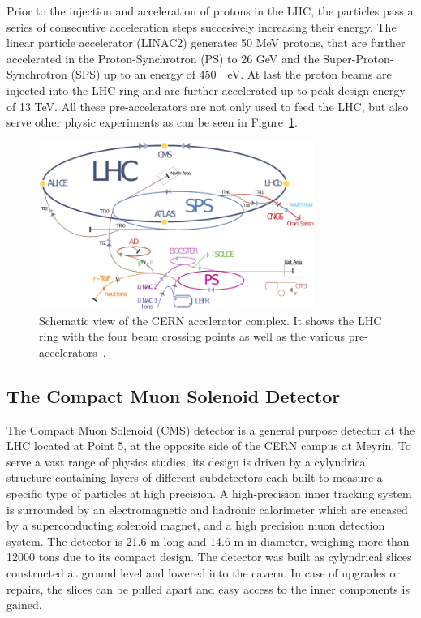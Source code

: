 Prior to the injection and acceleration of protons in the LHC, the particles
pass a series of consecutive acceleration steps succesively increasing their
energy. The linear particle accelerator (LINAC2) generates 50 MeV protons, that
are further accelerated in the Proton-Synchrotron (PS) to 26 GeV and
the Super-Proton-Synchrotron (SPS) up to an energy of \SI{450}{\giga
\electronvolt}. At last the proton beams are injected into the LHC ring and are
further accelerated up to peak design energy of 13 TeV. All these
pre-accelerators are not only used to feed the LHC, but also serve other physic
experiments as can be seen in Figure~\ref{fig:lhc_complex}.

\begin{figure}[htp]
    \centering
    \includegraphics[width=0.8\textwidth]{figures/cms_detector/lhc_accelerator_chain.pdf}
    \caption[CERN accelerator complex]{Schematic view of the CERN
        accelerator complex. It shows the LHC ring  with the four beam crossing
        points as well as the various pre-accelerators~\cite{LHC:COMPLEX}.}
    \label{fig:lhc_complex}
\end{figure}

\subsection{The Compact Muon Solenoid Detector}

The Compact Muon Solenoid (CMS) detector is a general purpose detector at the
LHC located at Point 5, at the opposite side of the CERN campus at Meyrin. To
serve a vast range of physics studies, its design is driven by a cylyndrical
structure containing layers of different subdetectors each built
to measure a specific type of particles at high precision. A high-precision
inner tracking system is surrounded by an electromagnetic and hadronic
calorimeter which are encased by a superconducting solenoid magnet, and a high
precision muon detection system. The detector is 21.6 m long and 14.6 m in
diameter, weighing more than 12000 tons due to its compact design. The detector
was built as cylyndrical slices constructed at ground level and lowered into the
cavern. In case of upgrades or repairs, the slices can be pulled apart and easy
access to the inner components is gained. 

